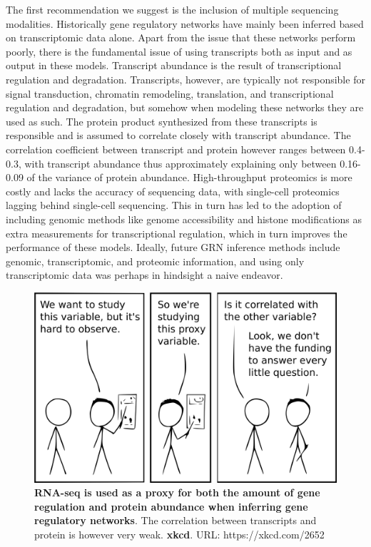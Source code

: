 The first recommendation we suggest is the inclusion of multiple sequencing modalities. Historically gene regulatory networks have mainly been inferred based on transcriptomic data alone. Apart from the issue that these networks perform poorly\cite{McCalla_2021,Chen_2018,Pratapa_2020}, there is the fundamental issue of using transcripts both as input and as output in these models. Transcript abundance is the result of transcriptional regulation and degradation. Transcripts, however, are typically not responsible for signal transduction, chromatin remodeling, translation, and transcriptional regulation and degradation, but somehow when modeling these networks they are used as such. The protein product synthesized from these transcripts is responsible and is assumed to correlate closely with transcript abundance. The correlation coefficient between transcript and protein however ranges between 0.4-0.3\cite{Fortelny2017,Franks2017}, with transcript abundance thus approximately explaining only between 0.16-0.09 of the variance of protein abundance. High-throughput proteomics is more costly and lacks the accuracy of sequencing data, with single-cell proteomics lagging behind single-cell sequencing\cite{Bennett2023}. This in turn has led to the adoption of including genomic methods like genome accessibility and histone modifications as extra measurements for transcriptional regulation\cite{Xu_2020,Kamal_2021,Aibar_2017}, which in turn improves the performance of these models. Ideally, future GRN inference methods include genomic, transcriptomic, and proteomic information, and using only transcriptomic data was perhaps in hindsight a naive endeavor.

\begin{figure}[H]
    \centering
    \includegraphics[width=0.7\linewidth]{ch.discussion/imgs/xkcd_proxy.png}
    \caption{\textbf{RNA-seq is used as a proxy for both the amount of gene regulation and protein abundance when inferring gene regulatory networks}. The correlation between transcripts and protein is however very weak. \textbf{xkcd}. URL: https://xkcd.com/2652}
    \label{fig:xkcd_proxy}
\end{figure}

